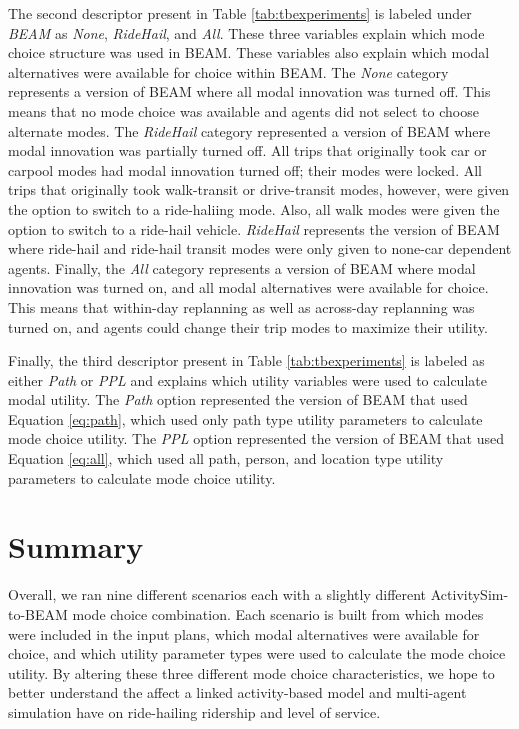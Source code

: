 \documentclass[fancy, masters]{byuthesis}
\begin{document}
The second descriptor present in Table \ref{tab:tbexperiments} is labeled under \emph{BEAM} as \emph{None}, \emph{RideHail}, and \emph{All}. These three variables explain which mode choice structure was used in BEAM. These variables also explain which modal alternatives were available for choice within BEAM. The \emph{None} category represents a version of BEAM where all modal innovation was turned off. This means that no mode choice was available and agents did not select to choose alternate modes. The \emph{RideHail} category represented a version of BEAM where modal innovation was partially turned off. All trips that originally took car or carpool modes had modal innovation turned off; their modes were locked. All trips that originally took walk-transit or drive-transit modes, however, were given the option to switch to a ride-haliing mode. Also, all walk modes were given the option to switch to a ride-hail vehicle. \emph{RideHail} represents the version of BEAM where ride-hail and ride-hail transit modes were only given to none-car dependent agents. Finally, the \emph{All} category represents a version of BEAM where modal innovation was turned on, and all modal alternatives were available for choice. This means that within-day replanning as well as across-day replanning was turned on, and agents could change their trip modes to maximize their utility.

Finally, the third descriptor present in Table \ref{tab:tbexperiments} is labeled as either \emph{Path} or \emph{PPL} and explains which utility variables were used to calculate modal utility. The \emph{Path} option represented the version of BEAM that used Equation \eqref{eq:path}, which used only path type utility parameters to calculate mode choice utility. The \emph{PPL} option represented the version of BEAM that used Equation \eqref{eq:all}, which used all path, person, and location type utility parameters to calculate mode choice utility.

\hypertarget{summary-1}{%
\section{Summary}\label{summary-1}}

Overall, we ran nine different scenarios each with a slightly different ActivitySim-to-BEAM mode choice combination. Each scenario is built from which modes were included in the input plans, which modal alternatives were available for choice, and which utility parameter types were used to calculate the mode choice utility. By altering these three different mode choice characteristics, we hope to better understand the affect a linked activity-based model and multi-agent simulation have on ride-hailing ridership and level of service.
\end{document}
